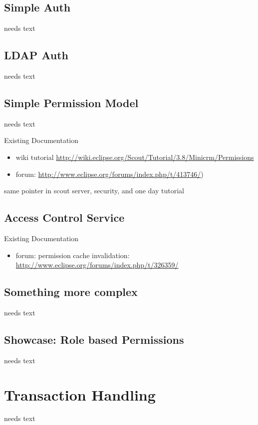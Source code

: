 \documentclass[a4paper,10pt,twoside]{book}
\begin{document}
\subsection{Simple Auth}
needs text

\subsection{LDAP Auth}
needs text

\subsection{Simple Permission Model}
needs text

\noindent Existing Documentation
\begin{itemize}
  \item wiki tutorial \url{http://wiki.eclipse.org/Scout/Tutorial/3.8/Minicrm/Permissions}
  \item forum: \url{http://www.eclipse.org/forums/index.php/t/413746/})
\end{itemize}

same pointer in scout server, security, and one day tutorial


\subsection{Access Control Service}

\noindent Existing Documentation
\begin{itemize}
  \item forum: permission cache invalidation: \url{http://www.eclipse.org/forums/index.php/t/326359/}
\end{itemize}

\subsection{Something more complex}
needs text

\subsection{Showcase: Role based Permissions}
needs text


\section{Transaction Handling}
needs text
\end{document}
